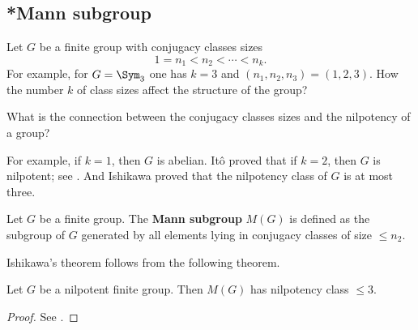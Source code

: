 %

\subsection{*Mann subgroup}

Let $G$ be a finite group with conjugacy classes sizes 
\[
1=n_1<n_2<\cdots<n_k.
\]
For example, for $G=\Sym_3$ one has $k=3$ and $(n_1,n_2,n_3)=(1,2,3)$. How the number $k$ of class sizes affect the structure of the group?

\begin{problem}
    What is the connection between the conjugacy classes sizes and the nilpotency of a group? 
\end{problem}

For example, if $k=1$, then $G$ is abelian. 
It\^o proved that if $k=2$, then $G$ is nilpotent; see \cite{MR61597}. 
And Ishikawa proved that the nilpotency class of $G$ is at most three. 

\begin{definition}
    Let $G$ be a finite group. The \textbf{Mann subgroup} $M(G)$ is defined as the subgroup
    of $G$ generated by all elements lying in conjugacy classes of size $\leq n_2$.
\end{definition}

Ishikawa's theorem
follows from the following theorem. 

\begin{theorem}[Mann]
\label{thm:Mann}
Let $G$ be a nilpotent finite group. Then $M(G)$ has nilpotency class $\leq3$.
\end{theorem}

\begin{proof}
    See \cite[Theorem 4.14]{MR2426855}.
\end{proof}

